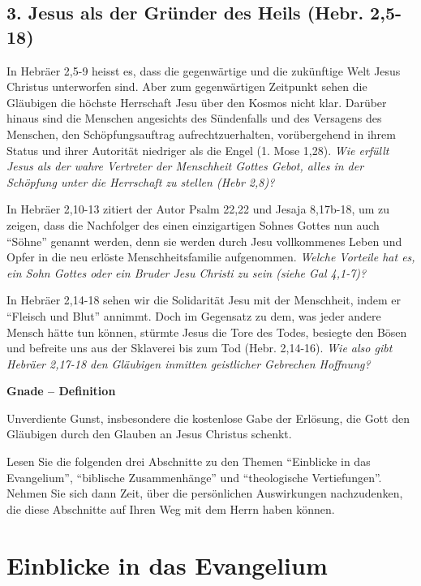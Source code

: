 \documentclass[
  12pt,
]{krantz}
\makeatletter
\newenvironment{kframe}{%
\medskip{}
\setlength{\fboxsep}{.8em}
 \def\at@end@of@kframe{}%
 \ifinner\ifhmode%
  \def\at@end@of@kframe{\end{minipage}}%
  \begin{minipage}{\columnwidth}%
 \fi\fi%
 \def\FrameCommand##1{\hskip\@totalleftmargin \hskip-\fboxsep
 \colorbox{shadecolor}{##1}\hskip-\fboxsep
     \hskip-\linewidth \hskip-\@totalleftmargin \hskip\columnwidth}%
 \MakeFramed {\advance\hsize-\width
   \@totalleftmargin\z@ \linewidth\hsize
   \@setminipage}}%
 {\par\unskip\endMakeFramed%
 \at@end@of@kframe}
\newenvironment{rmdblock}[1]
  {
  \begin{itemize}
  \renewcommand{\labelitemi}{
    \raisebox{-.7\height}[0pt][0pt]{
      {\setkeys{Gin}{width=3em,keepaspectratio}\texttt{[image: img/\#1]}}
    }
  }
  \setlength{\fboxsep}{1em}
  \begin{kframe}
  \item
  }
  {
  \end{kframe}
  \end{itemize}
  }
\newenvironment{rmddefinition}
  {\begin{rmdblock}{definition}}
  {\end{rmdblock}}
\makeatother
\begin{document}
\hypertarget{jesus-als-der-gruxfcnder-des-heils-hebr.-25-18}{%
\subsection{3. Jesus als der Gründer des Heils (Hebr. 2,5-18)}\label{jesus-als-der-gruxfcnder-des-heils-hebr.-25-18}}

In Hebräer 2,5-9 heisst es, dass die gegenwärtige und die zukünftige Welt Jesus Christus unterworfen sind. Aber zum gegenwärtigen Zeitpunkt sehen die Gläubigen die höchste Herrschaft Jesu über den Kosmos nicht klar. Darüber hinaus sind die Menschen angesichts des Sündenfalls und des Versagens des Menschen, den Schöpfungsauftrag aufrechtzuerhalten, vorübergehend in ihrem Status und ihrer Autorität niedriger als die Engel (1. Mose 1,28). \emph{Wie erfüllt Jesus als der wahre Vertreter der Menschheit Gottes Gebot, alles in der Schöpfung unter die Herrschaft zu stellen (Hebr 2,8)?}

In Hebräer 2,10-13 zitiert der Autor Psalm 22,22 und Jesaja 8,17b-18, um zu zeigen, dass die Nachfolger des einen einzigartigen Sohnes Gottes nun auch ``Söhne'' genannt werden, denn sie werden durch Jesu vollkommenes Leben und Opfer in die neu erlöste Menschheitsfamilie aufgenommen. \emph{Welche Vorteile hat es, ein Sohn Gottes oder ein Bruder Jesu Christi zu sein (siehe Gal 4,1-7)?}

In Hebräer 2,14-18 sehen wir die Solidarität Jesu mit der Menschheit, indem er ``Fleisch und Blut'' annimmt. Doch im Gegensatz zu dem, was jeder andere Mensch hätte tun können, stürmte Jesus die Tore des Todes, besiegte den Bösen und befreite uns aus der Sklaverei bis zum Tod (Hebr. 2,14-16). \emph{Wie also gibt Hebräer 2,17-18 den Gläubigen inmitten geistlicher Gebrechen Hoffnung?}

\begin{rmddefinition}
\textbf{Gnade -- Definition}

Unverdiente Gunst, insbesondere die kostenlose Gabe der Erlösung, die
Gott den Gläubigen durch den Glauben an Jesus Christus schenkt.
\end{rmddefinition}

Lesen Sie die folgenden drei Abschnitte zu den Themen ``Einblicke in das Evangelium'', ``biblische Zusammenhänge'' und ``theologische Vertiefungen''. Nehmen Sie sich dann Zeit, über die persönlichen Auswirkungen nachzudenken, die diese Abschnitte auf Ihren Weg mit dem Herrn haben können.

\hypertarget{einblicke-in-das-evangelium}{%
\section{Einblicke in das Evangelium}\label{einblicke-in-das-evangelium}}
\end{document}
